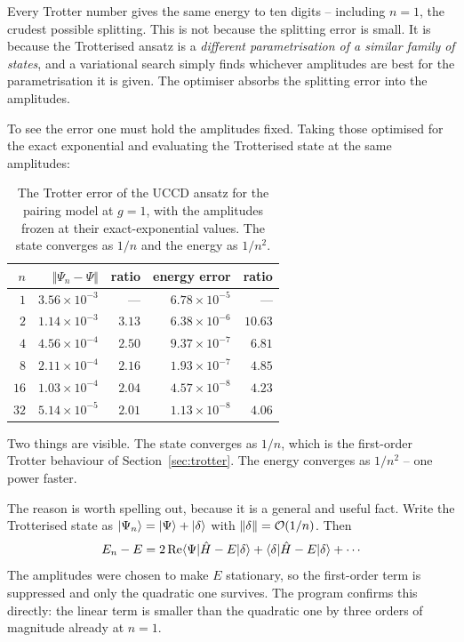 Every Trotter number gives the same energy to ten digits -- including
$n=1$, the crudest possible splitting.  This is not because the splitting
error is small.  It is because the Trotterised ansatz is a \emph{different
parametrisation of a similar family of states}, and a variational search
simply finds whichever amplitudes are best for the parametrisation it is
given.  The optimiser absorbs the splitting error into the amplitudes.

To see the error one must hold the amplitudes fixed.  Taking those optimised
for the exact exponential and evaluating the Trotterised state at the same
amplitudes:

\begin{table}[h]
\centering
\renewcommand{\arraystretch}{1.25}
\setlength{\tabcolsep}{11pt}
\begin{tabular}{rrrrr}
\toprule
$n$ & $\Vert\Psi_n-\Psi\Vert$ & ratio & energy error & ratio\\
\midrule
$1$  & $3.56\times10^{-3}$ & --- & $6.78\times10^{-5}$ & ---\\
$2$  & $1.14\times10^{-3}$ & $3.13$ & $6.38\times10^{-6}$ & $10.63$\\
$4$  & $4.56\times10^{-4}$ & $2.50$ & $9.37\times10^{-7}$ & $6.81$\\
$8$  & $2.11\times10^{-4}$ & $2.16$ & $1.93\times10^{-7}$ & $4.85$\\
$16$ & $1.03\times10^{-4}$ & $2.04$ & $4.57\times10^{-8}$ & $4.23$\\
$32$ & $5.14\times10^{-5}$ & $2.01$ & $1.13\times10^{-8}$ & $4.06$\\
\bottomrule
\end{tabular}
\caption{The Trotter error of the UCCD ansatz for the pairing model at
$g=1$, with the amplitudes frozen at their exact-exponential values.  The
state converges as $1/n$ and the energy as $1/n^2$.}
\label{tab:uccdtrotter}
\end{table}

Two things are visible.  The state converges as $1/n$, which is the
first-order Trotter behaviour of Section~\ref{sec:trotter}.  The energy
converges as $1/n^2$ -- one power faster.

The reason is worth spelling out, because it is a general and useful fact.
Write the Trotterised state as $\vert \Psi_n \rangle=\vert \Psi \rangle+\vert \delta \rangle$ with
$\Vert\delta\Vert=\mathcal{O}(1/n)$.  Then
\begin{equation}
  E_n - E
   = 2\,\mathrm{Re}\bracket{\Psi}{\hat{H}-E}{\delta}
   + \bracket{\delta}{\hat{H}-E}{\delta} + \cdots
  \label{eq:10-quadraticresponse}
\end{equation}
The amplitudes were chosen to make $E$ stationary, so the first-order term is
suppressed and only the quadratic one survives.  The program confirms this
directly: the linear term is smaller than the quadratic one by three orders of
magnitude already at $n=1$.

